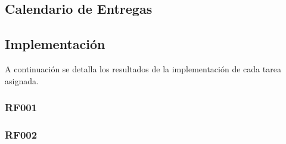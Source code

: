     


  \subsection{Calendario de Entregas}
  \label{subs:schedule_1}

    


\subsection{Implementación}
\label{sub:implementacion_iteracion_1}

  A continuación se detalla los resultados de la implementación de cada tarea asignada.

\subsubsection{RF001}
\label{subs:RF001}


%
%

\subsubsection{RF002}
\label{subs:RF002}


